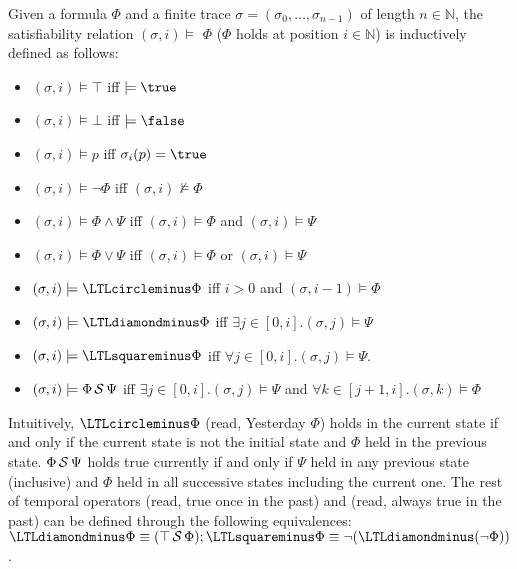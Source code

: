 \begin{mydef}[Semantics]\label{p_sem}
Given a \pltl formula $\Phi$ and a finite trace $\sigma = (\sigma_0, \dots, \sigma_{n-1})$ of length $n\in\mathbb{N}$, the satisfiability relation $(\sigma,i)\models$ $\Phi$ ($\Phi$
holds at position $i\in\mathbb{N}$) is inductively defined as follows:
  \begin{itemize}\setlength{\itemsep}{0em}
  \item $(\sigma,i)\models\top$ iff $\models\true$
 \item  $(\sigma,i)\models\bot$ iff  $\models\false$
  \item $(\sigma,i)\models p$ iff $\sigma_i(p) = \true$
  \item $(\sigma,i)\models \neg \Phi$ iff  $(\sigma,i)\not\models\Phi$
  \item $(\sigma,i)\models\Phi\wedge \Psi$ iff  $(\sigma,i)\models\Phi$  and $(\sigma, i)\models\Psi$
 \item  $(\sigma,i)\models\Phi\vee \Psi$ iff  $(\sigma,i)\models\Phi$  or $(\sigma, i)\models\Psi$
  \item $(\sigma,i)\models \yesterday \Phi$ iff  $i>0$ and $(\sigma,{i-1})\models\Phi$
 \item $(\sigma,i)\models \once \Phi$ iff  $\exists j\in[0, i].(\sigma, {j}) \models\Psi$
 \item $(\sigma,i)\models \historically \Phi$  iff  $\forall j\in[0, i].(\sigma, {j}) \models\Psi$.
  \item $(\sigma,i)\models \Phi \,\mathrm{\cal S}\, \Psi$  iff $\exists j\in[0, i].(\sigma, {j})\models\Psi$ and $\forall k\in[j+1, i].(\sigma, k)\models\Phi$
  \end{itemize}
\end{mydef}

Intuitively, $\yesterday \Phi$ (read, Yesterday $\Phi$) holds in the current state if and only if
the current state is not the initial state and $\Phi$ held in the previous state. $\Phi \,\mathrm{\cal S}\, \Psi$
holds  true currently if and only if
$\Psi$ held in any previous state (inclusive) and $\Phi$ held in all successive
states including the current one.
%
The rest of temporal operators \once (read, true once in the past) and \historically (read,
always true in the past)  can be defined through the following
equivalences: $\once\Phi\equiv (\top\since\Phi);
\historically\Phi\equiv \neg(\once (\neg\Phi))$.
